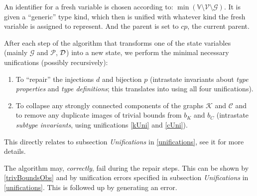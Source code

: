 \begin{defn}
    \label{freshVar}
    An identifier for a fresh variable is chosen according to: \linebreak $\min \left(\mathbb{V} \setminus \mathcal{V} \setminus \mathcal{G}\right)$. It is given a ``generic'' type kind, which then is unified with whatever kind the fresh variable is assigned to represent. And the parent is set to $cp$, the current parent.
\end{defn}

\begin{defn}
    \label{middlesteps}

    After each step of the algorithm that transforms one of the state variables (mainly $\mathcal{G}$ and $\mathcal{P}$, $\mathcal{D}$) into a new state, we perform the minimal necessary unifications (possibly recursively):

    \begin{enumerate}
        \item To ``repair'' the injections $d$ and bijection $p$ (intrastate invariants about \emph{type properties} and \emph{type definitions}; this translates into using all four unifications).

        \item To collapse any strongly connected components of the graphs $\mathcal{K}$ and  $\mathcal{C}$ and to remove any duplicate images of trivial bounds from $b_K$ and $b_C$ (intrastate \emph{subtype invariants}, using unifications \ref{kUni} and \ref{cUni}).
    \end{enumerate}

    This directly relates to subsection \emph{Unifications} in \cref{unifications}, see it for more details.
\end{defn}

\begin{remark}
    The algorithm may, \emph{correctly}, fail during the repair steps. This can be shown by \cref{trivBoundsObs} and by unification errors specified in subsection \emph{Unifications} in \cref{unifications}. This is followed up by generating an error.
\end{remark}

